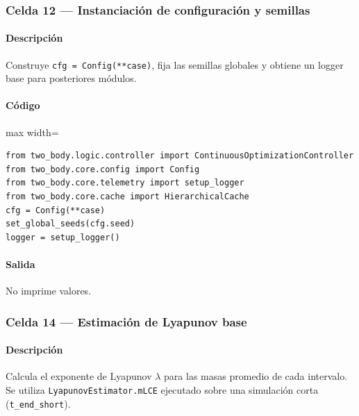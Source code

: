 \subsubsection*{Celda 12 — Instanciación de configuración y semillas}
\paragraph{Descripción} Construye \texttt{cfg = Config(**case)}, fija las semillas globales y obtiene un logger base para posteriores módulos.
\paragraph{Código}
\begin{listing}[H]
\caption{Celda 12: creación de la configuración de trabajo}
\label{lst:c04_cell12}
\begin{adjustbox}{max width=\textwidth}
\begin{minipage}{\textwidth}
\begin{verbatim}
from two_body.logic.controller import ContinuousOptimizationController
from two_body.core.config import Config
from two_body.core.telemetry import setup_logger
from two_body.core.cache import HierarchicalCache
cfg = Config(**case)
set_global_seeds(cfg.seed)
logger = setup_logger()
\end{verbatim}
\end{minipage}
\end{adjustbox}
\end{listing}
\paragraph{Salida} No imprime valores.

\subsubsection*{Celda 14 — Estimación de Lyapunov base}
\paragraph{Descripción} Calcula el exponente de Lyapunov $ \lambda $ para las masas promedio de cada intervalo. Se utiliza \texttt{LyapunovEstimator.mLCE} ejecutado sobre una simulación corta (\texttt{t\_end\_short}).

